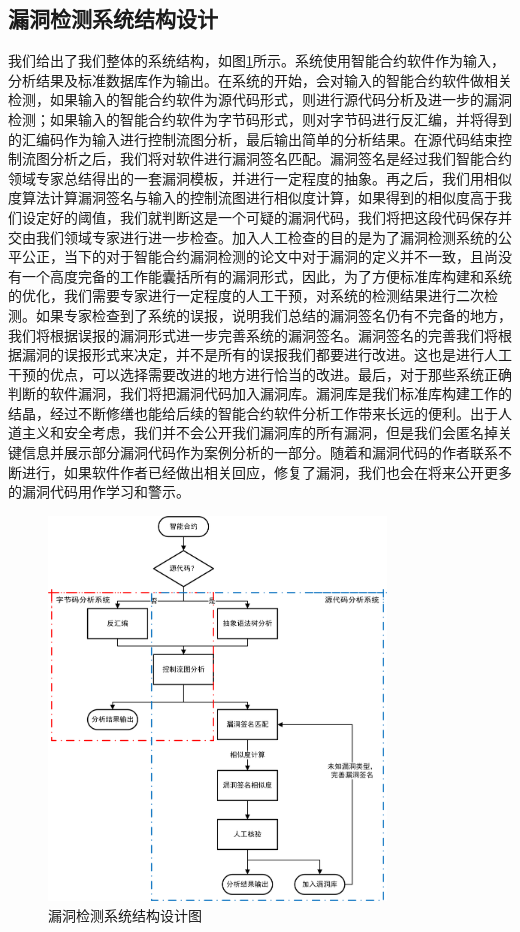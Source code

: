 \subsection{漏洞检测系统结构设计}
我们给出了我们整体的系统结构，如图\ref{fig:system_diagram}所示。系统使用智能合约软件作为输入，分析结果及标准数据库作为输出。在系统的开始，会对输入的智能合约软件做相关检测，如果输入的智能合约软件为源代码形式，则进行源代码分析及进一步的漏洞检测；如果输入的智能合约软件为字节码形式，则对字节码进行反汇编，并将得到的汇编码作为输入进行控制流图分析，最后输出简单的分析结果。在源代码结束控制流图分析之后，我们将对软件进行漏洞签名匹配。漏洞签名是经过我们智能合约领域专家总结得出的一套漏洞模板，并进行一定程度的抽象。再之后，我们用相似度算法计算漏洞签名与输入的控制流图进行相似度计算，如果得到的相似度高于我们设定好的阈值，我们就判断这是一个可疑的漏洞代码，我们将把这段代码保存并交由我们领域专家进行进一步检查。加入人工检查的目的是为了漏洞检测系统的公平公正，当下的对于智能合约漏洞检测的论文中对于漏洞的定义并不一致，且尚没有一个高度完备的工作能囊括所有的漏洞形式，因此，为了方便标准库构建和系统的优化，我们需要专家进行一定程度的人工干预，对系统的检测结果进行二次检测。如果专家检查到了系统的误报，说明我们总结的漏洞签名仍有不完备的地方，我们将根据误报的漏洞形式进一步完善系统的漏洞签名。漏洞签名的完善我们将根据漏洞的误报形式来决定，并不是所有的误报我们都要进行改进。这也是进行人工干预的优点，可以选择需要改进的地方进行恰当的改进。最后，对于那些系统正确判断的软件漏洞，我们将把漏洞代码加入漏洞库。漏洞库是我们标准库构建工作的结晶，经过不断修缮也能给后续的智能合约软件分析工作带来长远的便利。出于人道主义和安全考虑，我们并不会公开我们漏洞库的所有漏洞，但是我们会匿名掉关键信息并展示部分漏洞代码作为案例分析的一部分。随着和漏洞代码的作者联系不断进行，如果软件作者已经做出相关回应，修复了漏洞，我们也会在将来公开更多的漏洞代码用作学习和警示。
\begin{figure}[b]
\vspace{+2mm}
  \centering
  \includegraphics[width=0.8\textwidth]{figures/system_diagram.png}
  \caption{漏洞检测系统结构设计图}
  \label{fig:system_diagram}
\vspace{-5mm}
\end{figure}

